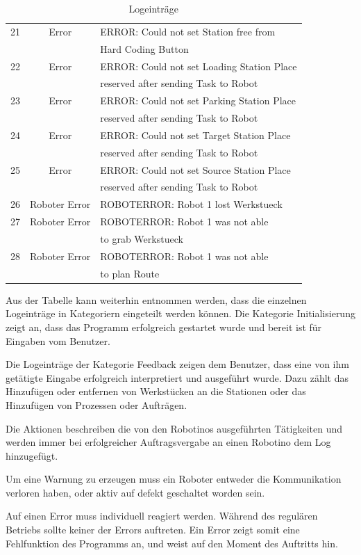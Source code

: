 \begin{table}[!ht]
\begin{tabular}{|c|c|l|}
    21 & Error & ERROR: Could not set Station free from \\ && Hard Coding Button \\
    22 & Error & ERROR: Could not set Loading Station Place \\ && reserved after sending Task to Robot \\
    23 & Error & ERROR: Could not set Parking Station Place \\ && reserved after sending Task to Robot \\
    24 & Error & ERROR: Could not set Target Station Place \\ && reserved after sending Task to Robot \\
    25 & Error & ERROR: Could not set Source Station Place \\ && reserved after sending Task to Robot \\
		\hline
    26 & Roboter Error & ROBOTERROR: Robot 1 lost Werkstueck \\
    27 & Roboter Error & ROBOTERROR: Robot 1 was not able \\ && to grab Werkstueck \\
    28 & Roboter Error & ROBOTERROR: Robot 1 was not able \\ && to plan Route \\
		\hline
	\end{tabular}
	\caption{Logeinträge}
	\label{tab:Log}
\end{table}

Aus der Tabelle kann weiterhin entnommen werden, dass die einzelnen Logeinträge in Kategoriern eingeteilt werden können. Die Kategorie Initialisierung zeigt an, dass das Programm erfolgreich gestartet wurde und bereit ist für Eingaben vom Benutzer. 

Die Logeinträge der Kategorie Feedback zeigen dem Benutzer, dass eine von ihm getätigte Eingabe erfolgreich interpretiert und ausgeführt wurde. Dazu zählt das Hinzufügen oder entfernen von Werkstücken an die Stationen oder das Hinzufügen von Prozessen oder Aufträgen. 

Die Aktionen beschreiben die von den Robotinos ausgeführten Tätigkeiten und werden immer bei erfolgreicher Auftragsvergabe an einen Robotino dem Log hinzugefügt. 

Um eine Warnung zu erzeugen muss ein Roboter entweder die Kommunikation verloren haben, oder aktiv auf defekt geschaltet worden sein. 

Auf einen Error muss individuell reagiert werden. Während des regulären Betriebs sollte keiner der Errors auftreten. Ein Error zeigt somit eine Fehlfunktion des Programms an, und weist auf den Moment des Auftritts hin.

